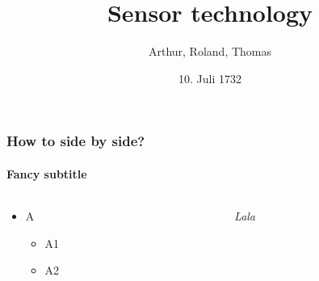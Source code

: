 \documentclass{beamer}
\date{10. Juli 1732}
\title{Sensor technology}
\author{Arthur, Roland, Thomas}
\begin{document}
\begin{frame}
    \titlepage
\end{frame}


\begin{frame}
    \frametitle{How to side by side?}
    \framesubtitle{Fancy subtitle}

    \begin{columns}
        \begin{column}{0.5\textwidth}
            \begin{itemize}
                \item A
                      \begin{itemize}
                          \item A1
                          \item A2
                      \end{itemize}
            \end{itemize}
        \end{column}
        \begin{column}{0.5\textwidth}
            \textit{Lala}
        \end{column}
    \end{columns}
\end{frame}










\end{document}
